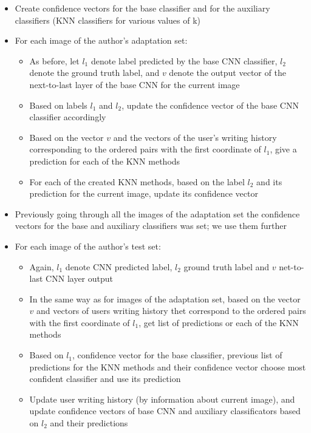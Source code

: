 \documentclass{article}
\begin{document}
\begin{itemize}
  \item Create confidence vectors for the base classifier and for the auxiliary classifiers (KNN classifiers for various values of k)
  \item For each image of the author's adaptation set: 
  \begin{itemize}
    \item As before, let $l_1$ denote label predicted by the base CNN classifier, $l_2$ denote the ground truth label, and $v$ denote the output vector of the next-to-last layer of the base CNN for the current image
    \item Based on labels $l_1$ and $l_2$, update the confidence vector of the base CNN classifier accordingly
    \item Based on the vector $v$ and the vectors of the user's writing history corresponding to the ordered pairs with the first coordinate of $l_1$, 
    give a prediction for each of the KNN methods
    \item For each of the created KNN methods, based on the label $l_2$ and its prediction for the current image, update its confidence vector
  \end{itemize}
  \item Previously going through all the images of the adaptation set the confidence vectors for the base and auxiliary classifiers was set; we use them further
  \item For each image of the author's test set:
  \begin{itemize}
    \item Again, $l_1$ denote CNN predicted label, $l_2$ ground truth label and $v$ net-to-last CNN layer output
    \item In the same way as for images of the adaptation set, based on the vector $v$ and vectors of users writing history thet correspond to the ordered pairs with the first coordinate of $l_1$, get list of predictions or each of the KNN methods
    \item Based on $l_1$, confidence vector for the base classifier, previous list of predictions for the KNN methods and their confidence vector choose most confident classifier and use its prediction
    \item Update user writing history (by information about current image), and update confidence vectors of base CNN and auxiliary classificators based on $l_2$ and their predictions
  \end{itemize}
\end{itemize}
\end{document}
